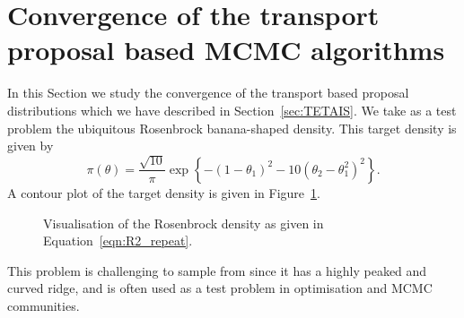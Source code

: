 \documentclass[final]{siamltex}
\begin{document}
\section[Convergence of transport MCMC]{Convergence of the transport proposal based MCMC algorithms}\label{sec:conv}

In this Section we study the convergence of the transport based
proposal distributions which we have described in
Section~\ref{sec:TETAIS}.
We take as a test problem the ubiquitous Rosenbrock banana-shaped
density. This target density is given by
\begin{equation}\label{eqn:R2_repeat}
	\pi(\theta) = \frac{\sqrt{10}}{\pi}\exp\left\{ -(1 - \theta_1)^2 - 10(\theta_2 - \theta_1^2)^2 \right\}.
\end{equation}
A contour plot of the target density is given in Figure~\ref{fig:R2_posterior}.
\begin{figure}
\centering
{}
\caption{Visualisation of the Rosenbrock density as given in Equation~\eqref{eqn:R2_repeat}.}
\label{fig:R2_posterior}
\end{figure}
This problem is challenging to sample from since it has a highly peaked and curved ridge, and is often used
as a test problem in optimisation and MCMC communities.
\end{document}
